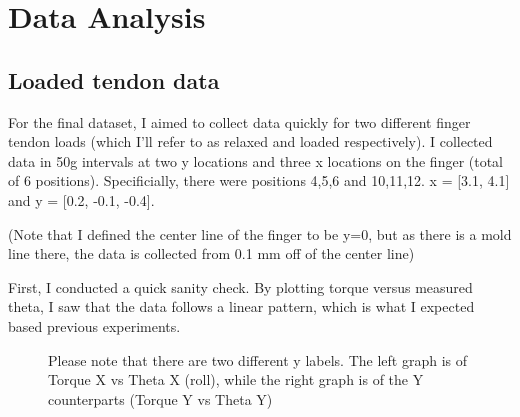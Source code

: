 \documentclass[preprint,12pt,3p]{elsarticle}
\begin{document}
\section{Data Analysis}

\subsection{Loaded tendon data}

For the final dataset, I aimed to collect data quickly for two different finger tendon loads
(which I'll refer to as relaxed and loaded respectively). I collected data in 50g intervals at two y
locations and three x locations on the finger (total of 6 positions).  Specificially, there were
positions 4,5,6 and 10,11,12.  x = [3.1, 4.1] and y = [0.2, -0.1, -0.4].

(Note that I defined the center line of the finger to be y=0, but as there is a mold line there, the
data is collected from 0.1 mm off of the center line)

First, I conducted a quick sanity check. By plotting torque versus measured theta, I saw that the data follows
a linear pattern, which is what I expected based previous experiments.


\begin{figure}[htbp]
    \centering 
        \hfil %
        \hfil
        \caption{ Please note that there are two different y labels. The left graph is of Torque X vs Theta X
        (roll), while the right graph is of the Y counterparts (Torque Y vs Theta Y)}
\end{figure}
\end{document}
